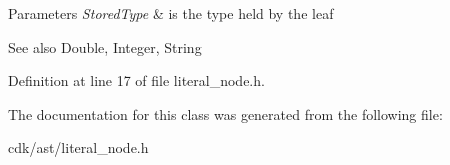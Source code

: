 \begin{DoxyParams}{Parameters}
{\em Stored\+Type} & is the type held by the leaf \\
\hline
\end{DoxyParams}
\begin{DoxySeeAlso}{See also}
Double, Integer, String 
\end{DoxySeeAlso}


Definition at line 17 of file literal\+\_\+node.\+h.



The documentation for this class was generated from the following file\+:\begin{DoxyCompactItemize}
\item 
cdk/ast/literal\+\_\+node.\+h\end{DoxyCompactItemize}
